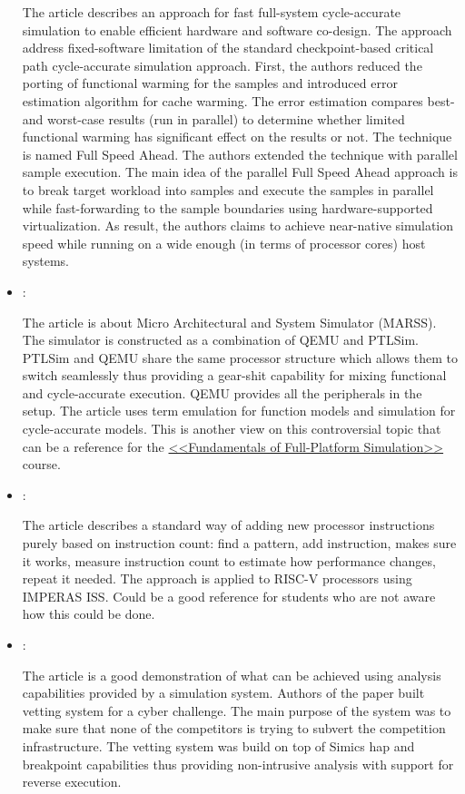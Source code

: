 \begin{itemize}
    The article describes an approach for fast full-system cycle-accurate simulation to enable efficient hardware and software co-design. The approach address fixed-software limitation of the standard checkpoint-based critical path cycle-accurate simulation approach. First, the authors reduced the porting of functional warming for the samples and introduced error estimation algorithm for cache warming. The error estimation compares best- and worst-case results (run in parallel) to determine whether limited functional warming has significant effect on the results or not. The technique is named Full Speed Ahead. The authors extended the technique with parallel sample execution. The main idea of the parallel Full Speed Ahead approach is to break target workload into samples and execute the samples in parallel while fast-forwarding to the sample boundaries using hardware-supported virtualization. As result, the authors claims to achieve near-native simulation speed while running on a wide enough (in terms of processor cores) host systems.

    \item \cite{Patel:MARSS:2011}:

    The article is about Micro Architectural and System Simulator (MARSS). The simulator is constructed as a combination of QEMU and PTLSim. PTLSim and QEMU share the same processor structure which allows them to switch seamlessly thus providing a gear-shit capability for mixing functional and cycle-accurate execution. QEMU provides all the peripherals in the setup. The article uses term emulation for function models and simulation for cycle-accurate models. This is another view on this controversial topic that can be a reference for the \href{https://github.com/yulyugin/sim-lectures}{<<Fundamentals of Full-Platform Simulation>>} course.

    \item \cite{Moore:Imperas-Custom-RISCV:2019}:

    The article describes a standard way of adding new processor instructions purely based on instruction count: find a pattern, add instruction, makes sure it works, measure instruction count to estimate how performance changes, repeat it needed. The approach is applied to RISC-V processors using IMPERAS ISS. Could be a good reference for students who are not aware how this could be done.

    \item \cite{Thompson:CGCMonitor:2018}:

    The article is a good demonstration of what can be achieved using analysis capabilities provided by a simulation system. Authors of the paper built vetting system for a cyber challenge. The main purpose of the system was to make sure that none of the competitors is trying to subvert the competition infrastructure. The vetting system was build on top of Simics hap and breakpoint capabilities thus providing non-intrusive analysis with support for reverse execution.
\end{itemize}

